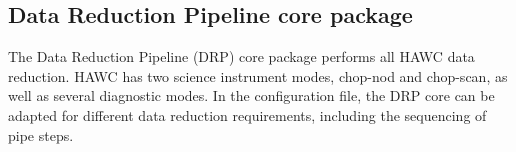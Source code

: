 \documentclass[11pt,twoside]{article}
\begin{document}
\subsection{Data Reduction Pipeline core package}

The Data Reduction Pipeline (DRP) core package performs all HAWC data
reduction. HAWC has two science instrument modes, chop-nod and
chop-scan, as well as several diagnostic modes. In the configuration
file, the DRP core can be adapted for different data reduction
requirements, including the sequencing of pipe steps.

\begin{figure}[!ht]
\begin{minipage}{\textwidth}
\leavevmode \centering
{}
\hfil
\hfil
{}
\hfil
{}
\end{minipage}


\end{figure}
\end{document}
